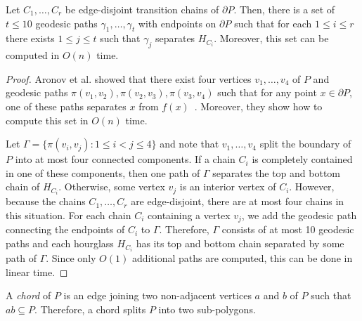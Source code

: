 \documentclass[a4paper,UKenglish]{lipics}
\newcommand{\ff}[1]{\ensuremath{f(#1)}}
\newcommand{\p}[2]{\ensuremath{\pi(#1, #2)}}
\begin{document}
\begin{lemma}\label{lemma:Split paths}
Let $C_1, \ldots, C_r$ be edge-disjoint transition chains of $\partial P$. Then, there is a set of $t \leq 10$ geodesic paths $\gamma_1, \ldots, \gamma_t$ with endpoints on $\partial P$ such that for each $1\leq i\leq r$ there exists $1\leq j\leq t$ such that $\gamma_j$ separates $H_{C_i}$.
Moreover, this set can be computed in $O(n)$ time.
\end{lemma}
\begin{proof}
Aronov et al. showed that there exist four vertices $v_1, \ldots, v_4$ of $P$ and geodesic paths $\p{v_1}{v_2}, \p{v_2}{v_3}, \p{v_3}{v_4}$ such that for any point $x\in \partial P$, one of these paths separates $x$ from $\ff{x}$~\cite[Lemma 2.7.6]{aronov1993furthest}. Moreover, they show how to compute this set in $O(n)$ time.

Let $\Gamma= \{\p{v_i}{v_j} : 1\leq i < j\leq 4\}$ and note that $v_1, \ldots, v_4$ split the boundary of $P$ into at most four connected components.
If a chain $C_i$ is completely contained in one of these components, then one path of $\Gamma$ separates the top and bottom chain of $H_{C_i}$. Otherwise, some vertex $v_j$ is an interior vertex of $C_i$. However, because the chains $C_1, \ldots, C_r$ are edge-disjoint, there are at most four chains in this situation. 
For each chain $C_i$ containing a vertex $v_j$, we add the geodesic path connecting the endpoints of $C_i$ to $\Gamma$.
Therefore, $\Gamma$ consists of at most 10 geodesic paths and each hourglass $H_{C_i}$ has its top and bottom chain separated by some path of $\Gamma$.
Since only $O(1)$ additional paths are computed, this can be done in linear time.
\end{proof}

A \emph{chord} of $P$ is an edge joining two non-adjacent vertices $a$ and $b$ of $P$ such that $ab\subseteq P$. Therefore, a chord splits $P$ into two sub-polygons.
\end{document}
